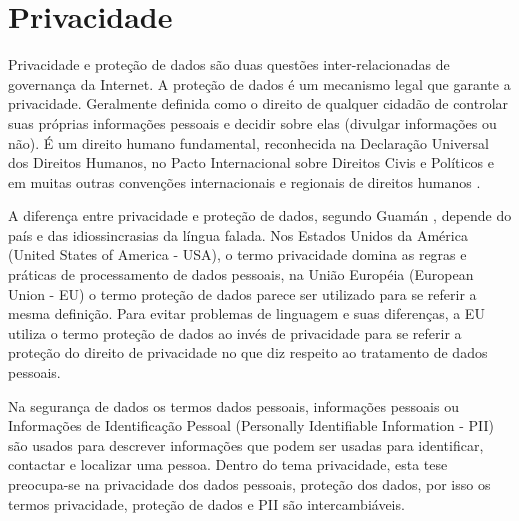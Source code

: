 \chapter{Privacidade}
\label{cap:privacidade}




Privacidade e proteção de dados são duas questões inter-relacionadas de governança da Internet. A proteção de dados é um mecanismo legal que garante a privacidade. Geralmente definida como o direito de qualquer cidadão de controlar suas próprias informações pessoais e decidir sobre elas (divulgar informações ou não). É um direito humano fundamental, reconhecida na Declaração Universal dos Direitos Humanos, no Pacto Internacional sobre Direitos Civis e Políticos e em muitas outras convenções internacionais e regionais de direitos humanos \cite{DWObservatory2022:online}.

A diferença entre privacidade e proteção de dados, segundo Guamán \cite{dsguaman2016:online}, depende do país e das idiossincrasias da língua falada. Nos Estados Unidos da América (United States of America - USA), o termo privacidade domina as regras e práticas de processamento de dados pessoais, na União Européia (European Union - EU) o termo proteção de dados parece ser utilizado para se referir a mesma definição. Para evitar problemas de linguagem e suas diferenças, a EU utiliza o termo proteção de dados ao invés de privacidade para se referir a proteção do direito de privacidade no que diz respeito ao tratamento de dados pessoais.

Na segurança de dados os termos dados pessoais, informações pessoais ou Informações de Identificação Pessoal (Personally Identifiable Information - PII) são usados para descrever informações que podem ser usadas para identificar, contactar e localizar uma pessoa. %
Dentro do tema privacidade, esta tese preocupa-se na privacidade dos dados pessoais, proteção dos dados, por isso os termos privacidade, proteção de dados e PII são intercambiáveis.

